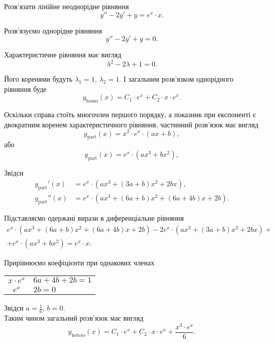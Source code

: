 \begin{example}
	Розв’язати лінійне неоднорідне рівняння \[ y'' - 2 y' + y = e^x \cdot x.\]
\end{example}
\begin{solution}
	Розв’язуємо однорідне рівняння
	\begin{equation*}
		y'' - 2 y' + y = 0.
	\end{equation*}
	
	Характеристичне рівняння має вигляд
	\begin{equation*}
		\lambda^2 - 2 \lambda + 1 = 0.
	\end{equation*}
	
	Його коренями будуть $\lambda_1 = 1$, $\lambda_2 = 1$. І загальним роз\-в'яз\-ком однорідного рівняння буде
	\begin{equation*}
		y_{\text{homo}}(x) = C_1 \cdot e^x + C_2 \cdot x \cdot e^x.
	\end{equation*}

	Оскільки справа стоїть многочлен першого порядку, а показник при експоненті є двократним коренем характеристичного рівняння, частинний розв’язок має вигляд
	\begin{equation*}
		y_{\text{part}}(x) = x^2 \cdot e^x \cdot (a x + b),
	\end{equation*}
	або
	\begin{equation*}
		y_{\text{part}}(x) = e^x \cdot (a x^3 + b x^2),
	\end{equation*}

	Звідси
	\begin{align*}
		y_{\text{part}}'(x) &= e^x \cdot (a x^3 + (3 a + b) x^2 + 2 b x), \\
		y_{\text{part}}''(x) &= e^x \cdot (a x^3 + (6 a + b) x^2 + (6 a + 4 b) x + 2 b).
	\end{align*}

	Підставляємо одержані вирази в диференціальне рівняння
	\begin{multline*}
		e^x \cdot (a x^3 + (6 a + b) x^2 + (6 a + 4 b) x + 2 b) - 2 e^x \cdot (a x^3 + (3 a + b) x^2 + 2 b x) + \\ + e^x \cdot (a x^3 + b x^2) = e^x \cdot x.
	\end{multline*}

	Прирівнюємо коефіцієнти при однакових членах
	\begin{table}[H]
		\centering
		\begin{tabular}{c|l}
			$x \cdot e^x$ & $6 a + 4 b + 2 b = 1$ \\
			$e^x$ & $2 b = 0$
		\end{tabular}
	\end{table}

	Звідси $a = \frac16$, $b = 0$. \\

	Таким чином загальний розв’язок має вигляд
	\begin{equation}
		y_{\text{hetero}}(x) = C_1 \cdot e^x + C_2 \cdot x \cdot e^x + \frac{x^3 \cdot e^x}{6}.
	\end{equation}
\end{solution}

